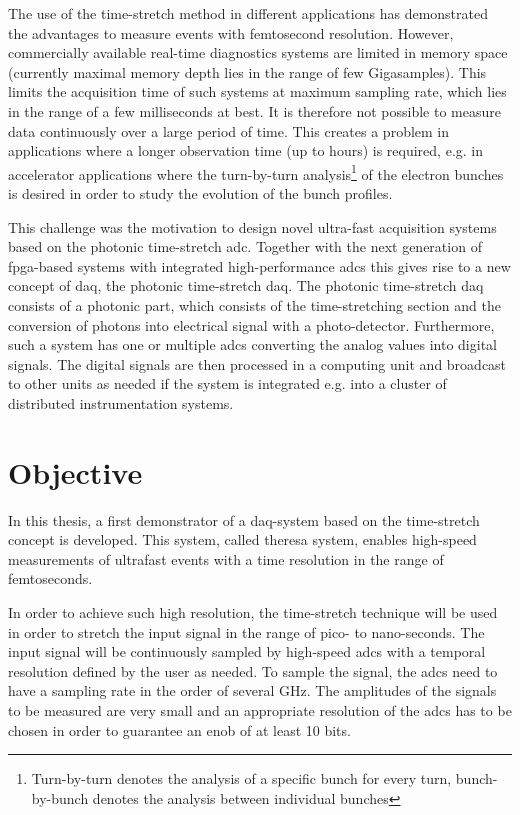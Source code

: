 The use of the time-stretch method in different applications has demonstrated the advantages to measure events with femtosecond resolution.
However, commercially available real-time diagnostics systems are limited in memory space (currently maximal memory depth lies in the range of few Gigasamples). 
This limits the acquisition time of such systems at maximum sampling rate, which lies in the range of a few milliseconds at best.
It is therefore not possible to measure data continuously over a large period of time. 
This creates a problem in applications where a longer observation time (up to hours) is required, e.g. in accelerator applications where the turn-by-turn analysis\footnote{Turn-by-turn denotes the analysis of a specific bunch for every turn, bunch-by-bunch denotes the analysis between individual bunches} of the electron bunches is desired in order to study the evolution of the bunch profiles. 

This challenge was the motivation to design novel ultra-fast acquisition systems based on the photonic time-stretch \gls{adc}. 
Together with the next generation of \gls{fpga}-based systems with integrated high-performance \glspl{adc} this gives rise to a new concept of \gls{daq}, the photonic time-stretch \gls{daq}.
The photonic time-stretch \gls{daq} consists of a photonic part, which consists of the time-stretching section and the conversion of photons into electrical signal with a photo-detector. 
Furthermore, such a system has one or multiple \glspl{adc} converting the analog values into digital signals.
The digital signals are then processed in a computing unit and broadcast to other units as needed if the system is integrated e.g. into a cluster of distributed instrumentation systems. 
 

\section{Objective}
In this thesis, a first demonstrator of a \gls{daq}-system based on the time-stretch concept is developed.
This system, called \gls{theresa} system, enables high-speed measurements of ultrafast events with a time resolution in the range of femtoseconds.

In order to achieve such high resolution, the time-stretch technique will be used in order to stretch the input signal in the range of pico- to nano-seconds.
The input signal will be continuously sampled by high-speed \glspl{adc} with a temporal resolution defined by the user as needed.
To sample the signal, the \glspl{adc} need to have a sampling rate in the order of several \si{\GHz}.
The amplitudes of the signals to be measured are very small and an appropriate resolution of the \glspl{adc} has to be chosen in order to guarantee an \gls{enob} of at least 10 bits. \cite{bielwaski}

